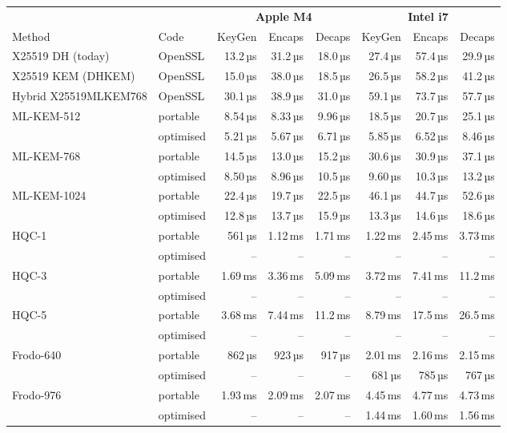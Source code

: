 \begin{tabular}{llrrrrrr}
\toprule
 & & \multicolumn{3}{c}{\textbf{Apple M4}} & \multicolumn{3}{c}{\textbf{Intel i7}} \\ \cmidrule(lr){3-5}\cmidrule(lr){6-8}
Method & Code & KeyGen & Encaps & Decaps & KeyGen & Encaps & Decaps \\
\midrule
X25519 DH (today) & OpenSSL & 13.2\,µs & 31.2\,µs & 18.0\,µs & 27.4\,µs & 57.4\,µs & 29.9\,µs \\
X25519 KEM (DHKEM) & OpenSSL & 15.0\,µs & 38.0\,µs & 18.5\,µs & 26.5\,µs & 58.2\,µs & 41.2\,µs \\
Hybrid X25519MLKEM768 & OpenSSL & 30.1\,µs & 38.9\,µs & 31.0\,µs & 59.1\,µs & 73.7\,µs & 57.7\,µs \\
\midrule
ML-KEM-512 & portable & 8.54\,µs & 8.33\,µs & 9.96\,µs & 18.5\,µs & 20.7\,µs & 25.1\,µs \\
 & optimised & 5.21\,µs & 5.67\,µs & 6.71\,µs & 5.85\,µs & 6.52\,µs & 8.46\,µs \\
ML-KEM-768 & portable & 14.5\,µs & 13.0\,µs & 15.2\,µs & 30.6\,µs & 30.9\,µs & 37.1\,µs \\
 & optimised & 8.50\,µs & 8.96\,µs & 10.5\,µs & 9.60\,µs & 10.3\,µs & 13.2\,µs \\
ML-KEM-1024 & portable & 22.4\,µs & 19.7\,µs & 22.5\,µs & 46.1\,µs & 44.7\,µs & 52.6\,µs \\
 & optimised & 12.8\,µs & 13.7\,µs & 15.9\,µs & 13.3\,µs & 14.6\,µs & 18.6\,µs \\
\midrule
HQC-1 & portable & 561\,µs & 1.12\,ms & 1.71\,ms & 1.22\,ms & 2.45\,ms & 3.73\,ms \\
 & optimised & – & – & – & – & – & – \\
HQC-3 & portable & 1.69\,ms & 3.36\,ms & 5.09\,ms & 3.72\,ms & 7.41\,ms & 11.2\,ms \\
 & optimised & – & – & – & – & – & – \\
HQC-5 & portable & 3.68\,ms & 7.44\,ms & 11.2\,ms & 8.79\,ms & 17.5\,ms & 26.5\,ms \\
 & optimised & – & – & – & – & – & – \\
\midrule
Frodo-640 & portable & 862\,µs & 923\,µs & 917\,µs & 2.01\,ms & 2.16\,ms & 2.15\,ms \\
 & optimised & – & – & – & 681\,µs & 785\,µs & 767\,µs \\
Frodo-976 & portable & 1.93\,ms & 2.09\,ms & 2.07\,ms & 4.45\,ms & 4.77\,ms & 4.73\,ms \\
 & optimised & – & – & – & 1.44\,ms & 1.60\,ms & 1.56\,ms \\

\end{tabular}
